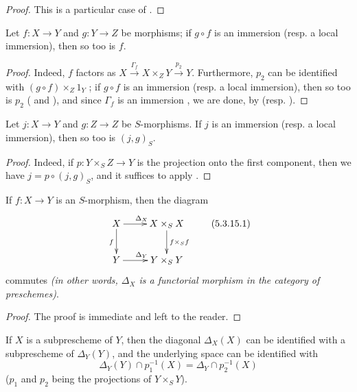 \begin{proof}
\label{proof-1.5.3.12}
This is a particular case of .
\end{proof}

\begin{cor}[5.3.13]
\label{1.5.3.13}
Let $f:X\to Y$ and $g:Y\to Z$ be morphisms;
if $g\circ f$ is an immersion (resp. a local immersion), then so too is $f$.
\end{cor}

\begin{proof}
\label{proof-1.5.3.13}
Indeed, $f$ factors as $X\xrightarrow{\Gamma_f}X\times_Z Y\xrightarrow{p_2}Y$.
Furthermore, $p_2$ can be identified with $(g\circ f)\times_Z 1_Y$ ;
if $g\circ f$ is an immersion (resp. a local immersion), then so too is $p_2$ ( and ), and since $\Gamma_f$ is an immersion , we are done, by  (resp. ).
\end{proof}

\begin{cor}[5.3.14]
\label{1.5.3.14}
Let $j:X\to Y$ and $g:Z\to Z$ be $S$-morphisms.
If $j$ is an immersion (resp. a local immersion), then so too is $(j,g)_S$.
\end{cor}

\begin{proof}
\label{proof-1.5.3.14}
Indeed, if $p:Y\times_S Z\to Y$ is the projection onto the first component, then we have $j=p\circ(j,g)_S$, and it suffices to apply .
\end{proof}

\begin{prop}[5.3.15]
\label{1.5.3.15}
If $f:X\to Y$ is an $S$-morphism, then the diagram
\begin{equation*}
\label{1.5.3.15.1}
  \xymatrix{
    X\ar[r]^{\Delta_X}\ar[d]_f &
    X\times_S X\ar[d]^{f\times_S f}\\
    Y\ar[r]^{\Delta_Y} &
    Y\times_S Y
  }\tag{5.3.15.1}
\end{equation*}
commutes \emph{(in other words, $\Delta_X$ is a functorial morphism in the category of preschemes)}.
\end{prop}

\begin{proof}
\label{proof-1.5.3.15}
The proof is immediate and left to the reader.
\end{proof}

\begin{cor}[5.3.16]
\label{1.5.3.16}
If $X$ is a subprescheme of $Y$, then the diagonal $\Delta_X(X)$ can be identified with a subprescheme of $\Delta_Y(Y)$, and the underlying space can be identified with
\[
  \Delta_Y(Y)\cap p_1^{-1}(X)=\Delta_Y\cap p_2^{-1}(X)
\]
($p_1$ and $p_2$ being the projections of $Y\times_S Y$).
\end{cor}

